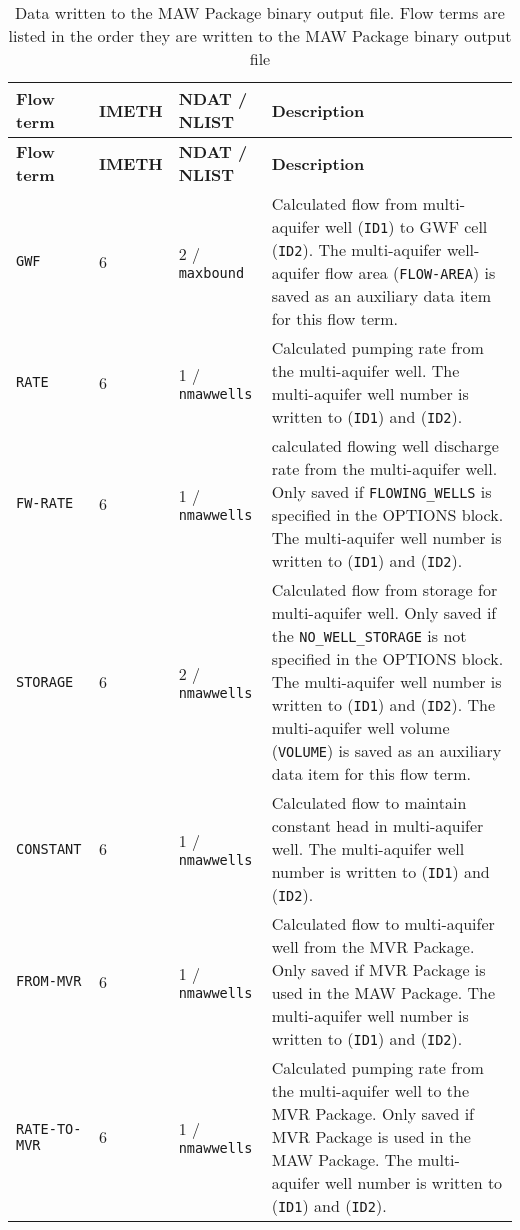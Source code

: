 \newpage
\begin{longtable}{p{3.5cm} p{2cm} p{3.5cm} p{6.5cm}}
\caption{Data written to the MAW Package binary output file. Flow terms are listed in the order they are written to the MAW Package binary output file} \tabularnewline
\hline
\hline
\textbf{Flow term} & \textbf{IMETH} & \textbf{NDAT / NLIST} & \textbf{Description} \\
\hline
\endfirsthead

\hline
\hline
\textbf{Flow term} & \textbf{IMETH} & \textbf{NDAT / NLIST} & \textbf{Description} \\
\hline
\endhead

\hline
\endfoot

\texttt{GWF} & 6 & 2 / \texttt{maxbound} & Calculated flow from multi-aquifer well (\texttt{ID1}) to GWF cell (\texttt{ID2}). The multi-aquifer well-aquifer flow area (\texttt{FLOW-AREA}) is saved as an auxiliary data item for this flow term.\\
\texttt{RATE} & 6 & 1 / \texttt{nmawwells} & Calculated pumping rate from the multi-aquifer well. The multi-aquifer well number is written to (\texttt{ID1}) and (\texttt{ID2}). \\
\texttt{FW-RATE} & 6 & 1 / \texttt{nmawwells} & calculated flowing well discharge rate from the multi-aquifer well. Only saved if \texttt{FLOWING\_WELLS} is specified in the OPTIONS block. The multi-aquifer well number is written to (\texttt{ID1}) and (\texttt{ID2}). \\
\texttt{STORAGE} & 6 & 2 / \texttt{nmawwells} & Calculated flow from storage for multi-aquifer well. Only saved if the \texttt{NO\_WELL\_STORAGE} is not specified in the OPTIONS block. The multi-aquifer well number is written to (\texttt{ID1}) and (\texttt{ID2}). The multi-aquifer well volume (\texttt{VOLUME}) is saved as an auxiliary data item for this flow term. \\
\texttt{CONSTANT} & 6 & 1 / \texttt{nmawwells} & Calculated flow to maintain constant head in multi-aquifer well. The multi-aquifer well number is written to (\texttt{ID1}) and (\texttt{ID2}). \\
\texttt{FROM-MVR} & 6 & 1 / \texttt{nmawwells} & Calculated flow to multi-aquifer well from the MVR Package. Only saved if MVR Package is used in the MAW Package. The multi-aquifer well number is written to (\texttt{ID1}) and (\texttt{ID2}). \\
\texttt{RATE-TO-MVR} & 6 & 1 / \texttt{nmawwells} & Calculated pumping rate from the multi-aquifer well to the MVR Package. Only saved if MVR Package is used in the MAW Package. The multi-aquifer well number is written to (\texttt{ID1}) and (\texttt{ID2}). \\

\end{longtable}
